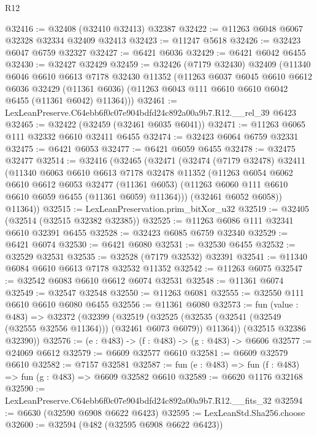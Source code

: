 \begin{lexlean}{R12}
\begin{coremodule}
@32416 := @32408 (@32410 @32413) @32387
@32422 := @11263 @6048 @6067 @32328 @32334 @32409 @32413
@32423 := @11247 @5618
@32426 := @32423 @6047 @6759 @32327
@32427 := @6421 @6036
@32429 := @6421 @6042 @6455
@32430 := @32427 @32429
@32459 := @32426
    (@7179 @32430)
    @32409
    (@11340
      @6046
      @6610
      @6613
      @7178
      @32430
      @11352
      (@11263
        @6037
        @6045
        @6610
        @6612
        @6036
        @32429
        (@11361 @6036)
        (@11263 @6043 @111 @6610 @6610 @6042 @6455 (@11361 @6042) @11364)))
@32461 := LexLeanPreserve.C64ebb6f0c07e904bdfd24c892a00a9b7.R12.__rel_39 @6423
@32465 := @32422 (@32459 (@32461 @6035 @6041))
@32471 := @11263 @6065 @111 @32332 @6610 @32411 @6455
@32474 := @32423 @6064 @6759 @32331
@32475 := @6421 @6053
@32477 := @6421 @6059 @6455
@32478 := @32475 @32477
@32514 := @32416
    (@32465
      (@32471
        (@32474
          (@7179 @32478)
          @32411
          (@11340
            @6063
            @6610
            @6613
            @7178
            @32478
            @11352
            (@11263
              @6054
              @6062
              @6610
              @6612
              @6053
              @32477
              (@11361 @6053)
              (@11263 @6060 @111 @6610 @6610 @6059 @6455 (@11361 @6059) @11364)))
          (@32461 @6052 @6058))
        @11364))
@32515 := LexLeanPreservation.prim_bitXor_u32
@32519 := @32405 (@32514 (@32515 @32382 @32385))
@32525 := @11263 @6086 @111 @32341 @6610 @32391 @6455
@32528 := @32423 @6085 @6759 @32340
@32529 := @6421 @6074
@32530 := @6421 @6080
@32531 := @32530 @6455
@32532 := @32529 @32531
@32535 := @32528 (@7179 @32532) @32391
@32541 := @11340 @6084 @6610 @6613 @7178 @32532 @11352
@32542 := @11263 @6075
@32547 := @32542 @6083 @6610 @6612 @6074 @32531
@32548 := @11361 @6074
@32549 := @32547 @32548
@32550 := @11263 @6081
@32555 := @32550 @111 @6610 @6610 @6080 @6455
@32556 := @11361 @6080
@32573 := fun (value : @483) =>
  @32372
    (@32399
      (@32519
        (@32525 (@32535 (@32541 (@32549 (@32555 @32556 @11364))) (@32461 @6073 @6079)) @11364))
      (@32515 @32386 @32390))
@32576 := (e : @483) -> (f : @483) -> (g : @483) -> @6606
@32577 := @24069 @6612
@32579 := @6609 @32577 @6610
@32581 := @6609 @32579 @6610
@32582 := @7157 @32581
@32587 := fun (e : @483) => fun (f : @483) => fun (g : @483) => @6609 @32582 @6610
@32589 := @6620 @1176 @32168
@32590 := LexLeanPreserve.C64ebb6f0c07e904bdfd24c892a00a9b7.R12.__fits_32
@32594 := @6630 (@32590 @6908 @6622 @6423)
@32595 := LexLeanStd.Sha256.choose
@32600 := @32594 (@482 (@32595 @6908 @6622 @6423))

\end{coremodule}
\end{lexlean}
